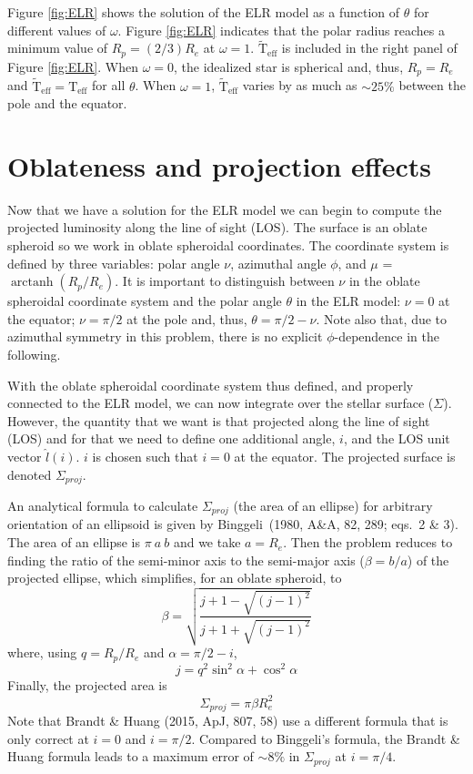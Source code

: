 \documentclass[12pt]{article}
\DeclareMathOperator{\arctanh}{arctanh}
\newcommand{\Teff}{\mathrm{T_{eff}}}
\newcommand{\twTeff}{\mathrm{\tilde{T}_{eff}}}
\begin{document}
Figure \ref{fig:ELR} shows the solution of the ELR model as a function of
$\theta$ for different values of $\omega$. Figure \ref{fig:ELR} indicates
that the polar radius reaches a minimum value of $R_p = (2/3) R_e$ at $\omega=1$.
$\twTeff$ is included in the right panel of Figure \ref{fig:ELR}. When
$\omega=0$, the idealized star is spherical and, thus, $R_p = R_e$ and
$\twTeff = \Teff$ for all $\theta$. When $\omega=1$, $\twTeff$ varies by as much
as $\sim25\%$ between the pole and the equator.

\section{Oblateness and projection effects}
Now that we have a solution for the ELR model we can begin to
compute the projected luminosity along the line of sight (LOS). The surface is
an oblate spheroid so we work in oblate spheroidal coordinates. The coordinate
system is defined by three variables: polar angle $\nu$, azimuthal angle
$\phi$, and $\mu$ = $\arctanh( R_p /R_e )$. It is important to distinguish
between $\nu$ in the oblate spheroidal coordinate system and the polar angle
$\theta$ in the ELR model: $\nu = 0$ at the equator; $\nu = \pi/2$ at the pole
and, thus, $\theta = \pi/2 - \nu$. Note also that, due to azimuthal symmetry
in this problem, there is no explicit $\phi$-dependence in the following.

With the oblate spheroidal coordinate system thus defined, and properly
connected to the ELR model, we can now integrate over the stellar surface
($\Sigma$). However, the quantity that we want is that projected along the line
of sight (LOS) and for that we need to define one additional angle, $i$, and the
LOS unit vector $\hat{l}(i)$. $i$ is chosen such that $i = 0$ at the equator.
The projected surface is denoted $\Sigma_{proj}$.

An analytical formula to calculate $\Sigma_{proj}$ (the area of an ellipse) for
arbitrary orientation of an ellipsoid is given by Binggeli~(1980, A\&A, 82, 289; eqs.\ 2 \& 3).
The area of an ellipse is $\pi~a~b$ and we take $a=R_e$. Then the problem reduces
to finding the ratio of the semi-minor axis to the semi-major axis ($\beta = b/a$)
of the projected ellipse, which simplifies, for an oblate spheroid, to
\begin{equation}
\beta = \sqrt{ \frac{j + 1 - \sqrt{ (j-1)^2}}{j+1+\sqrt{(j-1)^2}} }
\end{equation}
where, using $q=R_p/R_e$ and $\alpha=\pi/2-i$, 
\begin{equation}
j = q^2 \sin^2 \alpha + \cos^2 \alpha
\end{equation}
Finally, the projected area is 
\begin{equation}
  \Sigma_{proj} = \pi \beta R_e^2
\end{equation}
Note that Brandt \& Huang (2015, ApJ, 807, 58) use a different formula that is only
correct at $i = 0$ and $i=\pi/2$. Compared to Binggeli's formula, the
Brandt \& Huang formula leads to a maximum error of $\sim8\%$ in $\Sigma_{proj}$
at $i = \pi/4$.
\end{document}
